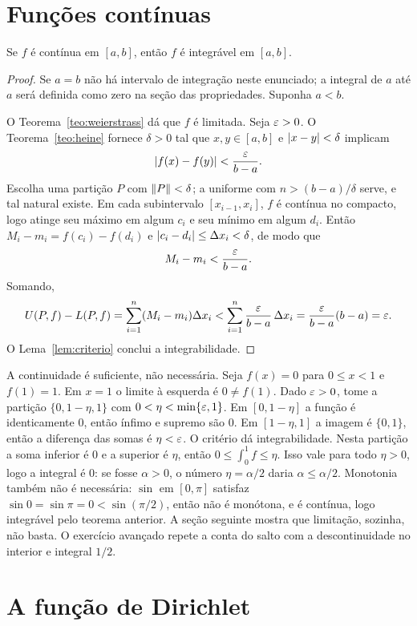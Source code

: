 \documentclass[11pt,a4paper]{article}
\begin{document}
\section{Funções contínuas}

\begin{teorema}\label{teo:continua}
Se $f$ é contínua em $[a,b]$, então $f$ é integrável em $[a,b]$.
\end{teorema}

\begin{proof}
Se $a=b$ não há intervalo de integração neste enunciado; a integral de $a$ até $a$ será definida como zero na seção das propriedades. Suponha $a<b$.

O Teorema~\ref{teo:weierstrass} dá que $f$ é limitada. Seja $\varepsilon>0$. O Teorema~\ref{teo:heine} fornece $\delta>0$ tal que $x,y\in[a,b]$ e $\left\lvert x-y \right\rvert<\delta$ implicam
\[
\left\lvert f(x)-f(y) \right\rvert<\frac{\varepsilon}{b-a}.
\]
Escolha uma partição $P$ com $\left\lVert P \right\rVert<\delta$; a uniforme com $n>(b-a)/\delta$ serve, e tal natural existe. Em cada subintervalo $[x_{i-1},x_i]$, $f$ é contínua no compacto, logo atinge seu máximo em algum $c_i$ e seu mínimo em algum $d_i$. Então $M_i-m_i=f(c_i)-f(d_i)$ e $\left\lvert c_i-d_i \right\rvert\le\Delta x_i<\delta$, de modo que
\[
M_i-m_i<\frac{\varepsilon}{b-a}.
\]
Somando,
\[
U(P,f)-L(P,f)
=\sum_{i=1}^n(M_i-m_i)\Delta x_i
<\sum_{i=1}^n\frac{\varepsilon}{b-a}\,\Delta x_i
=\frac{\varepsilon}{b-a}(b-a)
=\varepsilon.
\]
O Lema~\ref{lem:criterio} conclui a integrabilidade.
\end{proof}

A continuidade é suficiente, não necessária. Seja $f(x)=0$ para $0\le x<1$ e $f(1)=1$. Em $x=1$ o limite à esquerda é $0\neq f(1)$. Dado $\varepsilon>0$, tome a partição $\{0,1-\eta,1\}$ com $0<\eta<\min\{\varepsilon,1\}$. Em $[0,1-\eta]$ a função é identicamente $0$, então ínfimo e supremo são $0$. Em $[1-\eta,1]$ a imagem é $\{0,1\}$, então a diferença das somas é $\eta<\varepsilon$. O critério dá integrabilidade. Nesta partição a soma inferior é $0$ e a superior é $\eta$, então $0\le\int_0^1 f\le\eta$. Isso vale para todo $\eta>0$, logo a integral é $0$: se fosse $\alpha>0$, o número $\eta=\alpha/2$ daria $\alpha\le\alpha/2$. Monotonia também não é necessária: $\sin$ em $[0,\pi]$ satisfaz $\sin 0=\sin\pi=0<\sin(\pi/2)$, então não é monótona, e é contínua, logo integrável pelo teorema anterior. A seção seguinte mostra que limitação, sozinha, não basta. O exercício avançado repete a conta do salto com a descontinuidade no interior e integral $1/2$.

\section{A função de Dirichlet}
\end{document}
